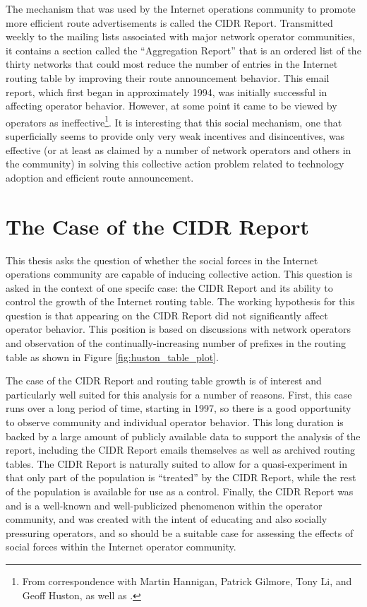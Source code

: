 The mechanism that was used by the Internet operations community to promote more efficient route advertisements is called the CIDR Report. Transmitted weekly to the mailing lists associated with major network operator communities, it contains a section called the ``Aggregation Report'' that is an ordered list of the thirty networks that could most reduce the number of entries in the Internet routing table by improving their route announcement behavior. This email report, which first began in approximately 1994, was initially successful in affecting operator behavior. However, at some point it came to be viewed by operators as ineffective\footnote{From correspondence with Martin Hannigan, Patrick Gilmore, Tony Li, and Geoff Huston, as well as \cite{Steenbergen:2010nx}.}. It is interesting that this social mechanism, one that superficially seems to provide only very weak incentives and disincentives, was effective (or at least as claimed by a number of network operators and others in the community) in solving this collective action problem related to technology adoption and efficient route announcement.

\section{The Case of the CIDR Report}

This thesis asks the question of whether the social forces in the Internet operations community are capable of inducing collective action. This question is asked in the context of one specifc case: the CIDR Report and its ability to control the growth of the Internet routing table. The working hypothesis for this question is that appearing on the CIDR Report did not significantly affect operator behavior. This position is based on discussions with network operators and observation of the continually-increasing number of prefixes in the routing table as shown in Figure \ref{fig:huston_table_plot}.

The case of the CIDR Report and routing table growth is of interest and particularly well suited for this analysis for a number of reasons. First, this case runs over a long period of time, starting in 1997, so there is a good opportunity to observe community and individual operator behavior. This long duration is backed by a large amount of publicly available data to support the analysis of the report, including the CIDR Report emails themselves as well as archived routing tables. The CIDR Report is naturally suited to allow for a quasi-experiment in that only part of the population is ``treated'' by the CIDR Report, while the rest of the population is available for use as a control. Finally, the CIDR Report was and is a well-known and well-publicized phenomenon within the operator community, and was created with the intent of educating and also socially pressuring operators, and so should be a suitable case for assessing the effects of social forces within the Internet operator community.

